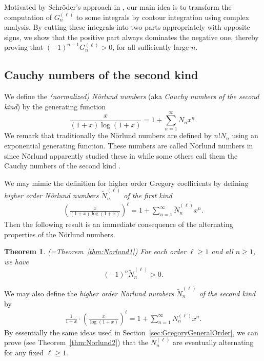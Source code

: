 \documentclass[11pt]{article}
\theoremstyle{plain}
\newtheorem{thm}{Theorem}[section]
\theoremstyle{definition}
\begin{document}
Motivated by Schr\"oder's approach in \cite{Schr1880}, our main idea is to transform the computation of $G_n^{(\ell)}$ to some integrals by contour integration using complex analysis. By cutting these integrals into two parts appropriately with opposite signs, we show that the positive part always dominates the negative one, thereby proving that $(-1)^{n-1}G_n^{(\ell)}>0$, for all sufficiently large $n$.


\subsection{Cauchy numbers of the second kind}
We define the \emph{(normalized) N\"orlund numbers} (aka \emph{Cauchy numbers of the second kind}) by the generating function
\begin{equation}\label{defn-Norlund1}
\frac{x}{(1+x)\log(1+x)}=1+\sum_{n=1}^\infty N_n x^n .
\end{equation}
We remark that traditionally the N\"orlund numbers are defined by $n!N_n$ using an exponential generating function.
These numbers are called N\"orlund numbers in \cite{Howard1993,Young2008} since N\"orlund apparently studied these in \cite[pp.\ 150-151]{Norlund1924} while some others call them the Cauchy numbers of the second kind \cite{C1974,Komatsu2015}.

We may mimic the definition for higher order Gregory coefficients by defining \emph{higher order N\"orlund numbers ${\tilde N}_n^{(\ell)}$ of the first kind}
\begin{align}\label{defn-Norlund-first}
 \left(\frac{x}{(1+x)\log(1+x)}\right)^\ell =1+\sum_{n=1}^\infty {\tilde N}_n^{(\ell)}x^n.
\end{align}
Then the following result is an immediate consequence of the alternating properties of the N\"orlund numbers.

\begin{thm}\label{thm:Norlund1A} \emph{(=Theorem~\ref{thm:Norlund1})}
For each order $\ell\ge 1$ and all $n\ge 1$, we have
\begin{equation*}
(-1)^{n} {\tilde N}_n^{(\ell)}>0.
\end{equation*}
\end{thm}

We may also define the \emph{higher order N\"orlund numbers ${\tilde N}_n^{(\ell)}$ of the second kind} by
\begin{align}\label{defn-Norlund-second}
\frac{1}{1+x}\cdot \left(\frac{x}{\log(1+x)}\right)^\ell =1+\sum_{n=1}^\infty N_n^{(\ell)}x^n.
\end{align}
By essentially the same ideas used in Section~\ref{sec:GregoryGeneralOrder}, we can prove (see Theorem~\ref{thm:Norlund2}) that the
$N_n^{(\ell)}$ are eventually alternating for any fixed $\ell\ge 1$.
\end{document}
